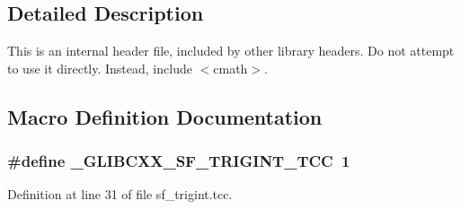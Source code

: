 \subsection{Detailed Description}
This is an internal header file, included by other library headers. Do not attempt to use it directly. Instead, include $<$cmath$>$. 

\subsection{Macro Definition Documentation}
\hypertarget{sf__trigint_8tcc_afde1ee684ded2155f3a3b305a31bb18e}{}
\subsubsection[{\+\_\+\+G\+L\+I\+B\+C\+X\+X\+\_\+\+S\+F\+\_\+\+T\+R\+I\+G\+I\+N\+T\+\_\+\+T\+C\+C}]{\setlength{\rightskip}{0pt plus 5cm}\#define \+\_\+\+G\+L\+I\+B\+C\+X\+X\+\_\+\+S\+F\+\_\+\+T\+R\+I\+G\+I\+N\+T\+\_\+\+T\+C\+C~1}\label{sf__trigint_8tcc_afde1ee684ded2155f3a3b305a31bb18e}


Definition at line 31 of file sf\+\_\+trigint.\+tcc.

